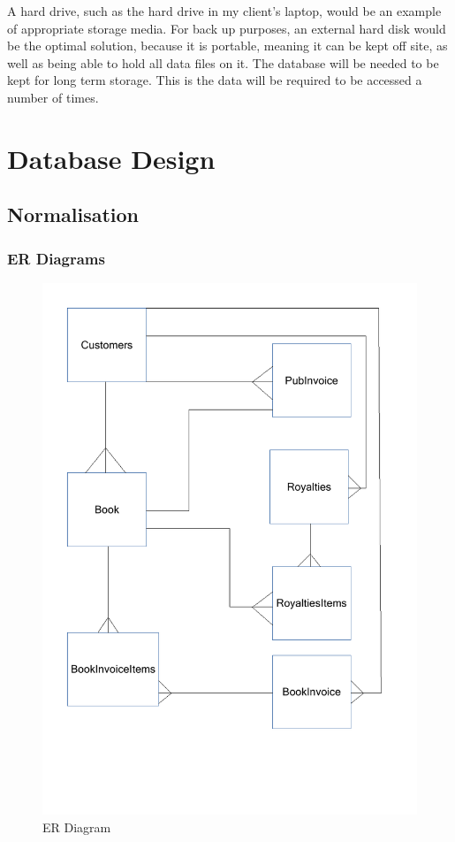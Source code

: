 A hard drive, such as the hard drive in my client's laptop, would be an example of appropriate storage media. For back up purposes, an external hard disk would be the optimal solution, because it is portable, meaning it can be kept off site, as well as being able to hold all data files on it. The database will be needed to be kept for long term storage. This is the data will be required to be accessed a number of times.

\section{Database Design}

\subsection{Normalisation}
 
\subsubsection{ER Diagrams}


\begin{figure}[H]
    \caption{ER Diagram} \label{ER_Diagram.pdf}
    \includegraphics[width=\textwidth]{./Design/ER_Diagram.pdf}
\end{figure}


